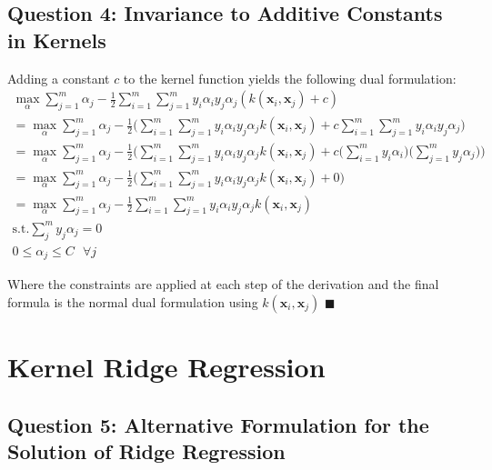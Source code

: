 \documentclass[11pt, oneside]{article}   	%
\begin{document}
\subsection{Question 4: Invariance to Additive Constants in Kernels}
Adding a constant $c$ to the kernel function yields the following dual formulation:
\begin{gather*}
\max_{\alpha} \sum_{j = 1}^m \alpha_j - \frac{1}{2} \sum_{i = 1}^{m}\sum_{j = 1}^{m} y_i\alpha_i y_j \alpha_j (k(\boldsymbol{x}_i , \boldsymbol{x}_j) + c)\\
= \max_{\alpha} \sum_{j = 1}^m \alpha_j - \frac{1}{2} \Big( \sum_{i = 1}^{m}\sum_{j = 1}^{m} y_i\alpha_i y_j \alpha_j k(\boldsymbol{x}_i , \boldsymbol{x}_j) + c \sum_{i = 1}^{m}\sum_{j = 1}^{m} y_i\alpha_i y_j \alpha_j \Big)\\
= \max_{\alpha} \sum_{j = 1}^m \alpha_j - \frac{1}{2} \Big( \sum_{i = 1}^{m}\sum_{j = 1}^{m} y_i\alpha_i y_j \alpha_j k(\boldsymbol{x}_i , \boldsymbol{x}_j) + c \Big( \sum_{i = 1}^{m} y_i\alpha_i \Big) \Big( \sum_{j = 1}^{m} y_j \alpha_j \Big) \Big)\\
= \max_{\alpha} \sum_{j = 1}^m \alpha_j - \frac{1}{2} \Big( \sum_{i = 1}^{m}\sum_{j = 1}^{m} y_i\alpha_i y_j \alpha_j k(\boldsymbol{x}_i , \boldsymbol{x}_j) + 0 \Big)\\
= \max_{\alpha} \sum_{j = 1}^m \alpha_j - \frac{1}{2} \sum_{i = 1}^{m}\sum_{j = 1}^{m} y_i\alpha_i y_j \alpha_j k(\boldsymbol{x}_i , \boldsymbol{x}_j)\\
\text{s.t.} \sum_j^m y_j \alpha_j = 0\\
0 \leq \alpha_j \leq C \text{ } \forall j
\end{gather*}

Where the constraints are applied at each step of the derivation and the final formula is the normal dual formulation using $k(\boldsymbol{x}_i, \boldsymbol{x}_j)$ $\blacksquare$

\newpage{}
\section{Kernel Ridge Regression}
\subsection{Question 5: Alternative Formulation for the Solution of Ridge Regression}
\end{document}
